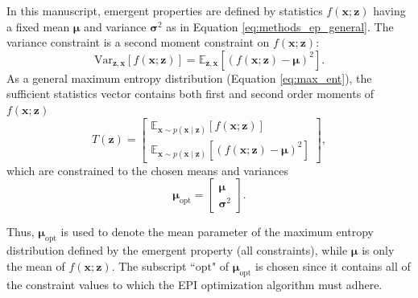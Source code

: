 \documentclass[11pt]{article}
\begin{document}
In this manuscript, emergent properties are defined by statistics $f(\mathbf{x}; \mathbf{z})$ having a fixed mean $\bm{\mu}$ and variance $\bm{\sigma}^2$ as in Equation \ref{eq:methods_ep_general}.
The variance constraint is a second moment constraint on $f(\mathbf{x}; \mathbf{z})$:
 \begin{equation}
\text{Var}_{\mathbf{z},\mathbf{x}}\left[f(\mathbf{x}; \mathbf{z})\right] = \mathbb{E}_{\mathbf{z},\mathbf{x}}\left[\left( f(\mathbf{x}; \mathbf{z}) - \bm{\mu}\right) ^2\right].
\end{equation}
As a general maximum entropy distribution (Equation \ref{eq:max_ent}), the sufficient statistics vector contains both first and second order moments of $f(\mathbf{x}; \mathbf{z})$
\begin{equation} \label{eq:moments}
T(\mathbf{z}) = \begin{bmatrix} \mathbb{E}_{\mathbf{x} \sim p(\mathbf{x} \mid \mathbf{z})} \left[ f(\mathbf{x}; \mathbf{z}) \right] \\ \mathbb{E}_{\mathbf{x} \sim p(\mathbf{x} \mid \mathbf{z})} \left[ \left( f(\mathbf{x}; \mathbf{z}) - \bm{\mu} \right)^2\right] \end{bmatrix},
\end{equation}
which are constrained to the chosen means and variances
\begin{equation} \label{eq:mu_opt}
\bm{\mu}_{\text{opt}} = \begin{bmatrix} \bm{\mu} \\ \bm{\sigma}^2 \end{bmatrix}.
\end{equation}

Thus, $\bm{\mu}_{\text{opt}}$ is used to denote the mean parameter of the maximum entropy distribution defined by the emergent property (all constraints), while $\bm{\mu}$ is only the mean of $f(\mathbf{x}; \mathbf{z})$.
The subscript ``$\text{opt}$" of $\bm{\mu}_{\text{opt}}$ is chosen since it contains all of the constraint values to which the EPI optimization algorithm must adhere.
\end{document}
